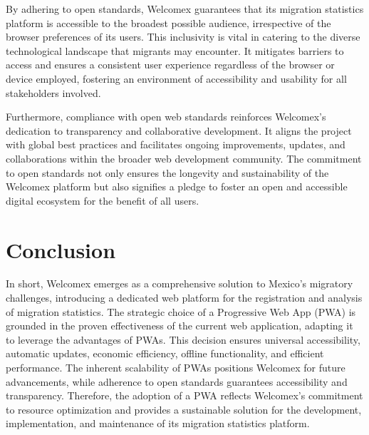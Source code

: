 \documentclass[conference]{IEEEtran}
\begin{document}
By adhering to open standards, Welcomex guarantees that its migration statistics platform is accessible to the broadest possible audience, irrespective of the browser preferences of its users. This inclusivity is vital in catering to the diverse technological landscape that migrants may encounter. It mitigates barriers to access and ensures a consistent user experience regardless of the browser or device employed, fostering an environment of accessibility and usability for all stakeholders involved.

Furthermore, compliance with open web standards reinforces Welcomex's dedication to transparency and collaborative development. It aligns the project with global best practices and facilitates ongoing improvements, updates, and collaborations within the broader web development community. The commitment to open standards not only ensures the longevity and sustainability of the Welcomex platform but also signifies a pledge to foster an open and accessible digital ecosystem for the benefit of all users.
\section{Conclusion}
In short, Welcomex emerges as a comprehensive solution to Mexico's migratory challenges, introducing a dedicated web platform for the registration and analysis of migration statistics. The strategic choice of a Progressive Web App (PWA) is grounded in the proven effectiveness of the current web application, adapting it to leverage the advantages of PWAs. This decision ensures universal accessibility, automatic updates, economic efficiency, offline functionality, and efficient performance. The inherent scalability of PWAs positions Welcomex for future advancements, while adherence to open standards guarantees accessibility and transparency. Therefore, the adoption of a PWA reflects Welcomex's commitment to resource optimization and provides a sustainable solution for the development, implementation, and maintenance of its migration statistics platform.
\end{document}
